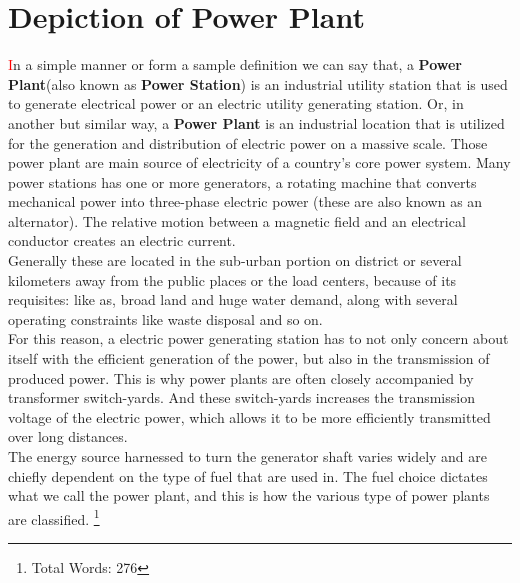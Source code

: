 \documentclass[11 pt]{article}
\begin{document}
\section{Depiction of Power Plant}
\justify
{
{\huge\textcolor{red}{\hspace{5 mm}I}}n a simple manner or form a sample definition we can say that, a \textbf{Power Plant}(also known as \textbf{Power Station}) is an industrial utility station that is used to generate electrical power or an electric utility generating station. Or, in another but similar way, a \textbf{Power Plant} is an industrial location that is utilized for the generation and distribution of electric power on a massive scale. Those power plant are main source of electricity of a country's core power system. Many power stations has one or more generators, a rotating machine that converts mechanical power into three-phase electric power (these are also known as an alternator). The relative motion between a magnetic field and an electrical conductor creates an electric current.\vspace{2 mm}\\
Generally these are located in the sub-urban portion on district or several kilometers away from the public places or the load centers, because of its requisites: like as, broad land and huge water demand, along with several operating constraints like waste disposal and so on.\vspace{2 mm}\\
For this reason, a electric power generating station has to not only concern about itself with the efficient generation of the power, but also in the transmission of produced power. This is why power plants are often closely accompanied by transformer switch-yards. And these switch-yards increases the transmission voltage of the electric power, which allows it to be more efficiently transmitted over long distances.\vspace{2 mm}\\
The energy source harnessed to turn the generator shaft varies widely and are chiefly dependent on the type of fuel that are used in. The fuel choice dictates what we call the power plant, and this is how the various type of power plants are classified.
}
\footnote{Total Words: 276}

\pagebreak
\end{document}
